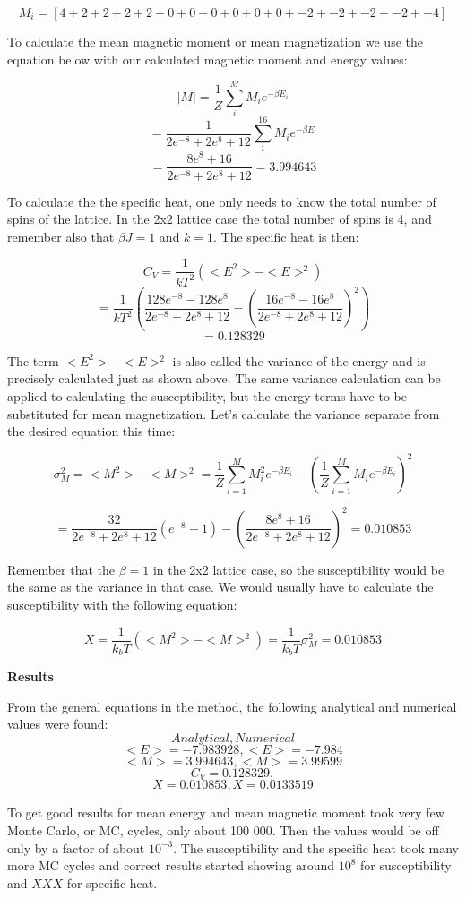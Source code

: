 \documentclass[10pt,a4paper]{article}
\begin{document}
$$
M_i = [4 + 2 + 2 + 2 + 2 + 0 + 0 + 0 + 0 + 0 + 0 + -2 + -2 + -2 + -2 + -4]
$$

\noindent To calculate the mean magnetic moment or mean magnetization we use the equation below with our calculated magnetic moment and energy values:

$$
|M| = \frac{1}{Z}\sum^{M}_{i}M_ie^{-\beta E_i}
$$
$$
 = \frac{1}{2e^{-8} + 2e^8 + 12}\sum^{16}_{1}M_ie^{-\beta E_i}
$$
$$
 = \frac{8e^{8} + 16}{2e^{-8} + 2e^8 + 12} = 3.994643
$$



\noindent To calculate the the specific heat, one only needs to know the total number of spins of the lattice. In the 2x2 lattice case the total number of spins is 4, and remember also that $\beta J = 1$ and $k = 1$. The specific heat is then:

$$
C_V = \frac{1}{kT^2}(<E^2> - <E>^2)
$$
$$
 = \frac{1}{kT^2}(\frac{128e^{-8} - 128e^8}{2e^{-8} + 2e^8 + 12} - (\frac{16e^{-8} - 16e^8}{2e^{-8} + 2e^8 + 12})^2)
$$
$$
 = 0.128329
$$

\noindent The term $<E^2> - <E>^2$ is also called the variance of the energy and is precisely calculated just as shown above. The same variance calculation can be applied to calculating the susceptibility, but the energy terms have to be substituted for mean magnetization.
Let's calculate the variance separate from the desired equation this time:

$$
\sigma_M^2 = <M^2>-<M>^2 = \frac{1}{Z}\sum^{M}_{i = 1}M_i^2 e^{-\beta E_i} - (\frac{1}{Z}\sum^{M}_{i = 1}M_i e^{-\beta E_i})^2
$$

$$
 = \frac{32}{2e^{-8} + 2e^8 + 12}(e^{-8}+1) - (\frac{8e^8 + 16}{2e^{-8} + 2e^8 + 12})^2 = 0.010853
$$

\noindent Remember that the $\beta = 1$ in the 2x2 lattice case, so the susceptibility would be the same as the variance in that case. We would usually have to calculate the susceptibility with the following equation:

$$
X = \frac{1}{k_bT}(<M^2> - <M>^2) = \frac{1}{k_bT}\sigma_M^2 = 0.010853
$$

\newpage

\begin{center}
{\LARGE\bf Results}
\end{center}

From the general equations in the method, the following analytical and numerical values were found:
$$
Analytical ,Numerical
$$
$$
<E> = -7.983928 , <E> = -7.984
$$
$$
<M> = 3.994643 , <M> = 3.99599
$$
$$
C_V = 0.128329 , 
$$
$$
X = 0.010853 , X = 0.0133519
$$

\noindent To get good results for mean energy and mean magnetic moment took very few Monte Carlo, or MC, cycles, only about 100 000. Then the values would be off only by a factor of about $10^{-3}$. The susceptibility and the specific heat took many more MC cycles and correct results started showing around $10^{8}$ for susceptibility and $XXX$ for specific heat.
\end{document}
